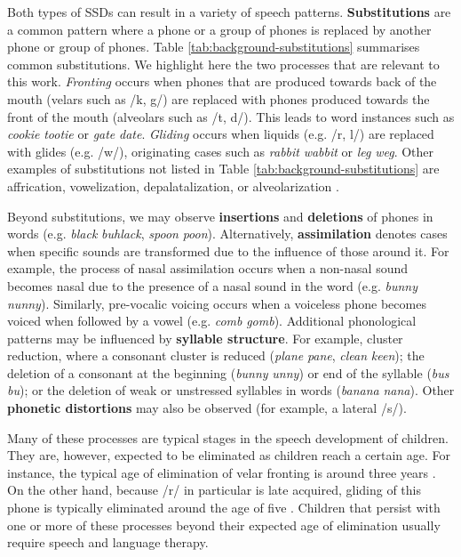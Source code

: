 Both types of SSDs can result in a variety of speech patterns.
\textbf{Substitutions} are a common pattern where a phone or a group of phones is replaced by another phone or group of phones.
Table \ref{tab:background-substitutions} summarises common substitutions.
We highlight here the two processes that are relevant to this work.
\emph{Fronting} occurs when phones that are produced towards back of the mouth (velars such as /k, g/) are replaced with phones produced towards the front of the mouth (alveolars such as /t, d/).
This leads to word instances such as \emph{cookie} \textrightarrow{} \emph{tootie} or \emph{gate} \textrightarrow{} \emph{date}.
\emph{Gliding} occurs when liquids (e.g. /r, l/) are replaced with glides (e.g. /w/), originating cases such as \emph{rabbit} \textrightarrow{} \emph{wabbit} or \emph{leg} \textrightarrow{}\emph{weg}. 
Other examples of substitutions not listed in Table \ref{tab:background-substitutions} are affrication, vowelization, depalatalization, or alveolarization \citep{mcleod2017children}.

Beyond substitutions, we may observe \textbf{insertions} and \textbf{deletions} of phones in words (e.g. \emph{black} \textrightarrow{} \emph{buhlack}, \emph{spoon} \textrightarrow{} \emph{poon}).
Alternatively, \textbf{assimilation} denotes cases when specific sounds are transformed due to the influence of those around it.
For example, the process of nasal assimilation occurs when a non-nasal sound becomes nasal due to the presence of a nasal sound in the word (e.g. \emph{bunny}\textrightarrow{} \emph{nunny}).
Similarly, pre-vocalic voicing occurs when a voiceless phone becomes voiced when followed by a vowel (e.g. \emph{comb} \textrightarrow{} \emph{gomb}).
Additional phonological patterns may be influenced by \textbf{syllable structure}.
For example, cluster reduction, where a consonant cluster is reduced (\emph{plane}\textrightarrow{} \emph{pane}, \emph{clean} \textrightarrow{} \emph{keen}); the deletion of a consonant at the beginning (\emph{bunny} \textrightarrow{} \emph{unny}) or end of the syllable (\emph{bus} \textrightarrow{} \emph{bu}); or the deletion of weak or unstressed syllables in words (\emph{banana} \textrightarrow{} \emph{nana}).
Other \textbf{phonetic distortions} may also be observed (for example, a lateral /s/).

Many of these processes are typical stages in the speech development of children.
They are, however, expected to be eliminated as children reach a certain age.
For instance, the typical age of elimination of velar fronting is around three years \citep{mcleod2018children}. 
On the other hand, because /r/ in particular is late acquired, gliding of this phone is typically eliminated around the age of five \citep{mcleod2018children}. 
Children that persist with one or more of these processes beyond their expected age of elimination usually require speech and language therapy.


